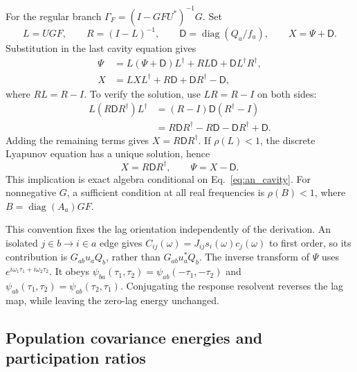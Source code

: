 For the regular branch $\Gamma_F=(I-GFU^*)^{-1}G$. Set
\begin{equation}
 L=UGF,\qquad R=(I-L)^{-1},\qquad
 \mathsf D=\operatorname{diag}(Q_a/f_a),\qquad X=\Psi+\mathsf D.
 \label{eq:an_R}
\end{equation}
Substitution in the last cavity equation gives
\begin{align}
 \Psi&=L(\Psi+\mathsf D)L^\dagger
                  +RL\mathsf D+\mathsf DL^\dagger R^\dagger,\\
 X&=LXL^\dagger+R\mathsf D+\mathsf DR^\dagger-\mathsf D,
 \label{eq:an_Lyapunov}
\end{align}
where $RL=R-I$. To verify the solution, use $LR=R-I$ on both sides:
\begin{align}
 L(R\mathsf DR^\dagger)L^\dagger
  &=(R-I)\mathsf D(R^\dagger-I)\\
  &=R\mathsf DR^\dagger-R\mathsf D-\mathsf DR^\dagger+\mathsf D.
\end{align}
Adding the remaining terms gives $X=R\mathsf DR^\dagger$. If $\rho(L)<1$,
the discrete Lyapunov equation has a unique solution, hence
\begin{equation}
 \boxed{X=R\mathsf DR^\dagger,\qquad \Psi=X-\mathsf D.}
 \label{eq:an_final_pair}
\end{equation}
This implication is exact algebra conditional on Eq.~\eqref{eq:an_cavity}.
For nonnegative $G$, a sufficient condition at all real frequencies is
$\rho(B)<1$, where $B=\operatorname{diag}(A_a)GF$.

This convention fixes the lag orientation independently of the derivation.
An isolated $j\in b\to i\in a$ edge gives
$C_{ij}(\omega)=J_{ij}s_i(\omega)c_j(\omega)$ to first order, so its
contribution is $G_{ab}u_aQ_b$, rather than $G_{ab}u_a^*Q_b$.
The inverse transform of $\Psi$ uses
$e^{i\omega_1\tau_1+i\omega_2\tau_2}$. It obeys
$\psi_{ba}(\tau_1,\tau_2)=\psi_{ab}(-\tau_1,-\tau_2)$ and
$\psi_{ab}(\tau_1,\tau_2)=\psi_{ab}(\tau_2,\tau_1)$.
Conjugating the response resolvent reverses the lag map, while leaving the
zero-lag energy unchanged.

\subsection{Population covariance energies and participation ratios}

